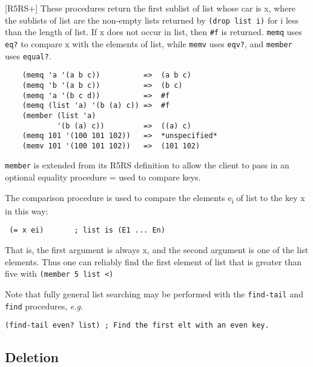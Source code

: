 \begin{entry}{%
  }

  {[}R5RS+{]}   These
  procedures return the first sublist of list whose car is x, where
  the sublists of list are the non-empty lists returned by
  \texttt{(drop\ list\ i)} for i less than the length of list. If x
  does not occur in list, then \texttt{\#f} is returned. \texttt{memq}
  uses \texttt{eq?} to compare x with the elements of list, while
  \texttt{memv} uses \texttt{eqv?}, and \texttt{member} uses
  \texttt{equal?}.

\begin{verbatim}
    (memq 'a '(a b c))          =>  (a b c)
    (memq 'b '(a b c))          =>  (b c)
    (memq 'a '(b c d))          =>  #f
    (memq (list 'a) '(b (a) c)) =>  #f
    (member (list 'a)
            '(b (a) c))         =>  ((a) c)
    (memq 101 '(100 101 102))   =>  *unspecified*
    (memv 101 '(100 101 102))   =>  (101 102)
\end{verbatim}

  \texttt{member} is extended from its R5RS definition to allow the
  client to pass in an optional equality procedure = used to compare
  keys.

  The comparison procedure is used to compare the elements
  e\textsubscript{i} of list to the key x in this way:

  \texttt{\ (=\ x\ ei)\ \ \ \ \ \ \ ;\ list\ is\ (E1\ ...\ En)}

  That is, the first argument is always x, and the second argument is
  one of the list elements. Thus one can reliably find the first
  element of list that is greater than five with \texttt{(member\ 5\
    list\ \textless{})}

  Note that fully general list searching may be performed with the
  \texttt{find-tail} and \texttt{find} procedures, \emph{e.g.}

\begin{verbatim}
(find-tail even? list) ; Find the first elt with an even key.
\end{verbatim}
\end{entry}

\subsection{{Deletion}}

